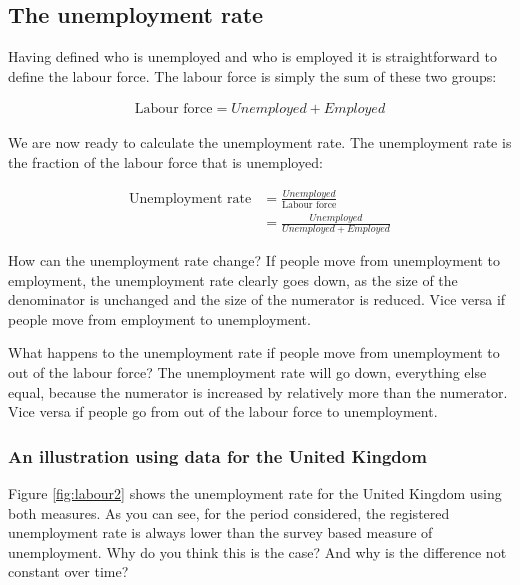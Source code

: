 \documentclass[
]{book}
\begin{document}
\hypertarget{the-unemployment-rate}{%
\subsection*{The unemployment rate}\label{the-unemployment-rate}}

Having defined who is unemployed and who is employed it is straightforward to define the labour force. The labour force is simply the sum of these two groups:

\begin{align}
  \text{Labour force}=Unemployed+Employed
\end{align}

We are now ready to calculate the unemployment rate. The unemployment rate is the fraction of the labour force that is unemployed:

\begin{align}
  \text{Unemployment rate}&=\frac{Unemployed}{\text{Labour force}}\nonumber\\
  &=\frac{Unemployed}{Unemployed+Employed}
\end{align}

How can the unemployment rate change? If people move from unemployment to employment, the unemployment rate clearly goes down, as the size of the denominator is unchanged and the size of the numerator is reduced. Vice versa if people move from employment to unemployment.

What happens to the unemployment rate if people move from unemployment to out of the labour force? The unemployment rate will go down, everything else equal, because the numerator is increased by relatively more than the numerator. Vice versa if people go from out of the labour force to unemployment.

\hypertarget{an-illustration-using-data-for-the-united-kingdom}{%
\subsubsection*{An illustration using data for the United Kingdom}\label{an-illustration-using-data-for-the-united-kingdom}}

Figure \ref{fig:labour2} shows the unemployment rate for the United Kingdom using both measures. As you can see, for the period considered, the registered unemployment rate is always lower than the survey based measure of unemployment. Why do you think this is the case? And why is the difference not constant over time?
\end{document}
